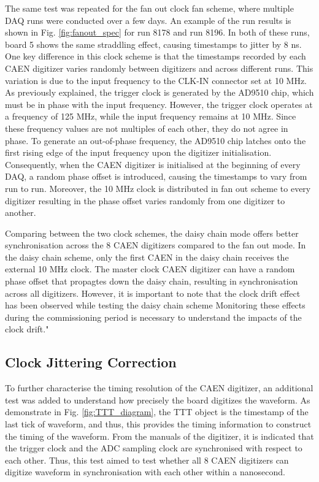 The same test was repeated for the fan out clock fan scheme, where multiple DAQ runs were conducted over a few days.
An example of the run results is shown in Fig. \ref{fig:fanout_spec} for run 8178 and run 8196.
In both of these runs, board 5 shows the same straddling effect, causing timestamps to jitter by 8 ns.
One key difference in this clock scheme is that the timestamps recorded by each CAEN digitizer varies randomly between digitizers and across different runs. 
This variation is due to the input frequency to the CLK-IN connector set at 10 MHz.
As previously explained, the trigger clock is generated by the AD9510 chip, which must be in phase with the input frequency. 
However, the trigger clock operates at a frequency of 125 MHz, while the input frequency remains at 10 MHz. 
Since these frequency values are not multiples of each other, they do not agree in phase.
To generate an out-of-phase frequency, the AD9510 chip latches onto the first rising edge of the input frequency upon the digitizer initialisation. 
Consequently, when the CAEN digitizer is initialised at the beginning of every DAQ, a random phase offset is introduced, causing the timestamps to vary from run to run.
Moreover, the 10 MHz clock is distributed in fan out scheme to every digitizer resulting in the phase offset varies randomly from one digitizer to another.

Comparing between the two clock schemes, the daisy chain mode offers better synchronisation across the 8 CAEN digitizers compared to the fan out mode.
In the daisy chain scheme, only the first CAEN in the daisy chain receives the external 10 MHz clock.
The master clock CAEN digitizer can have a random phase offset that propagtes down the daisy chain, resulting in synchronisation across all digitizers.
However, it is important to note that the clock drift effect has been observed while testing the daisy chain scheme
Monitoring these effects during the commissioning period is necessary to understand the impacts of the clock drift."

\subsection{Clock Jittering Correction}

To further characterise the timing resolution of the CAEN digitizer, an additional test was added to understand how precisely the board digitizes the waveform.
As demonstrate in Fig. \ref{fig:TTT_diagram}, the TTT object is the timestamp of the last tick of waveform, and thus, this provides the timing information to construct the timing of the waveform.
From the manuals of the digitizer, it is indicated that the trigger clock and the ADC sampling clock are synchronised with respect to each other.
Thus, this test aimed to test whether all 8 CAEN digitizers can digitize waveform in synchronisation with each other within a nanosecond. 


